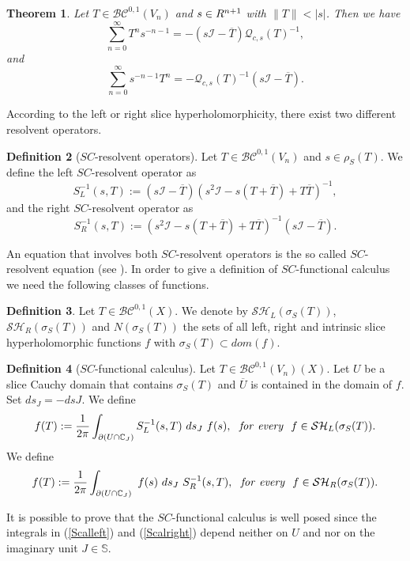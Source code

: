 \documentclass[reqno,11pt]{amsart}
\numberwithin{equation}{section}
\newtheorem{theorem}{Theorem}[section]
\theoremstyle{definition}
\newtheorem{definition}[theorem]{Definition}
\newcommand{\rr}{\mathbb{R}}
\begin{document}
\begin{theorem}
	Let $T\in\mathcal {BC}^{0,1}(V_n)$ and $s\in\mathbb \rr^{n+1}$ with $\|T\|< |s|$. Then we have
	$$ \sum_{n=0}^{\infty}T^n s^{-n-1}=-(s\mathcal I-\overline T)\mathcal{Q}_{c,s}(T)^{-1},$$
	and
	$$ \sum_{n=0}^{\infty}s^{-n-1}T^n=-\mathcal{Q}_{c,s}(T)^{-1}(s\mathcal I-\overline T). $$
\end{theorem}
According to the left or right slice hyperholomorphicity, there exist two different resolvent operators.
\begin{definition}[$SC$-resolvent operators]
	Let $T\in\mathcal{BC}^{0,1}(V_n)$ and $s\in\rho_S(T)$. We define the left $SC$-resolvent operator as
	$$ S^{-1}_{L}(s,T):=(s\mathcal I-\overline T)(s^2\mathcal I-s(T+\overline T)+T\overline T)^{-1}, $$
	and the right $SC$-resolvent operator as
	$$ S^{-1}_R(s, T):=(s^2\mathcal I-s(T+\overline T)+T\overline T)^{-1}(s\mathcal I-\overline T). $$
\end{definition}

An equation that involves both $SC$-resolvent operators is the so called $SC$-resolvent equation (see \cite{ACGS15}). In order to give a definition of $SC$-functional calculus we need the following classes of functions.

\begin{definition}
	Let $T \in \mathcal{BC}^{0,1}(X)$. We denote by $\mathcal{SH}_L(\sigma_S(T))$, $\mathcal{SH}_R(\sigma_S(T))$ and $N(\sigma_S(T))$ the sets of all left, right and intrinsic slice hyperholomorphic functions $f$ with $ \sigma_S(T) \subset dom(f)$.
\end{definition}

\begin{definition}[$SC$-functional calculus]
	\label{Sfun}
	Let $T \in \mathcal{BC}^{0,1}(V_n)(X)$. Let $U$ be a slice Cauchy domain that contains $\sigma_S(T)$  and $\overline{U}$ is contained in the domain of $f$.  Set $ds_J=-dsJ$. We define
	\begin{equation}
		\label{Scalleft}
		f(T):={{1}\over{2\pi }} \int_{\partial (U\cap \mathbb{C}_J)} S_L^{-1} (s,T)\  ds_J \ f(s), \ \ {\it for\ every}\ \ f\in \mathcal{SH}_L(\sigma_S(T)).
	\end{equation}
	We define
	\begin{equation}
		\label{Scalright}
		f(T):={{1}\over{2\pi }} \int_{\partial (U\cap \mathbb{C}_J)} \  f(s)\ ds_J
		\ S_R^{-1} (s,T),\ \  {\it for\ every}\ \ f\in \mathcal{SH}_R(\sigma_S(T)).
	\end{equation}
\end{definition}
It is possible to prove that the $SC$-functional calculus is well posed since the integrals in (\ref{Scalleft}) and (\ref{Scalright}) depend neither on $U$ and nor on the imaginary unit $J\in\mathbb{S}$.
\end{document}
